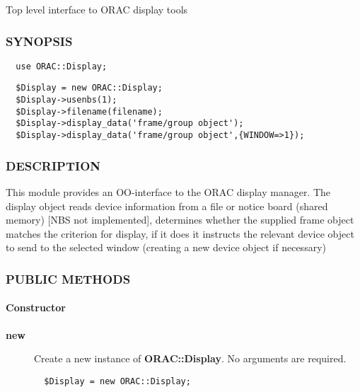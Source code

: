Top level interface to ORAC display tools

\subsubsection*{SYNOPSIS\label{ORAC::Display_SYNOPSIS}}\begin{verbatim}
  use ORAC::Display;
\end{verbatim}
\begin{verbatim}
  $Display = new ORAC::Display;
  $Display->usenbs(1);
  $Display->filename(filename);
  $Display->display_data('frame/group object');
  $Display->display_data('frame/group object',{WINDOW=>1});
\end{verbatim}
\subsubsection*{DESCRIPTION\label{ORAC::Display_DESCRIPTION}}

This module provides an OO-interface to the ORAC display manager.  The
display object reads device information from a file or notice board
(shared memory) [NBS not implemented], determines whether the supplied
frame object matches the criterion for display, if it does it
instructs the relevant device object to send to the selected window
(creating a new device object if necessary)

\subsubsection*{PUBLIC METHODS\label{ORAC::Display_PUBLIC_METHODS}}\paragraph*{Constructor\label{ORAC::Display_Constructor}}\begin{description}
\item[\textbf{new}] \mbox{}

Create a new instance of \textbf{ORAC::Display}. No arguments are
required.

\begin{verbatim}
  $Display = new ORAC::Display;
\end{verbatim}
\end{description}
